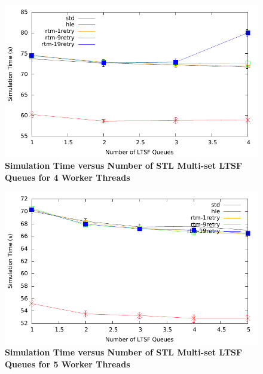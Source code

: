 \documentclass[11pt]{book}
\begin{document}
\begin{figure}[H]
    \centering
    \graphicspath{ {./figures/} }
    \includegraphics[width=\textwidth,height=\textheight,keepaspectratio]{contThrMig-hugeEpidemicSim-timeVSschedQs-multiset-4thread}
    \caption{\textbf{Simulation Time versus Number of STL Multi-set LTSF Queues
    for 4 Worker Threads}}
    \label{fig:contThrMig_timeVSschq_4threads}
\end{figure}

\begin{figure}[H]
    \centering
    \graphicspath{ {./figures/} }
    \includegraphics[width=\textwidth,height=\textheight,keepaspectratio]{contThrMig-hugeEpidemicSim-timeVSschedQs-multiset-5thread}
    \caption{\textbf{Simulation Time versus Number of STL Multi-set LTSF Queues
    for 5 Worker Threads}}
    \label{fig:contThrMig_timeVSschq_5threads}
\end{figure}
\end{document}
